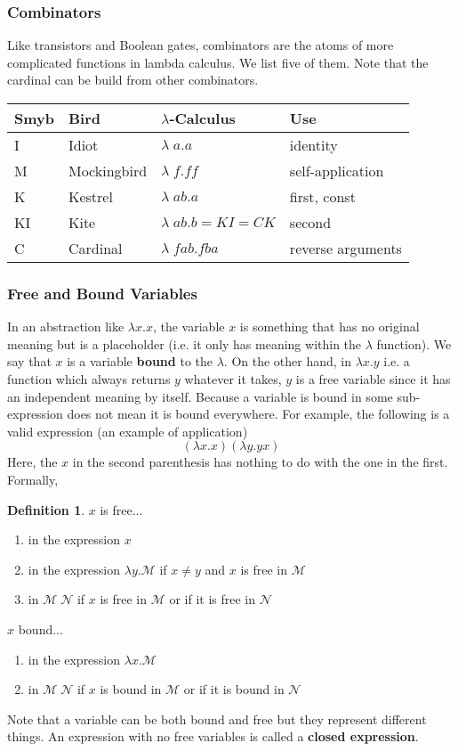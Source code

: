 \documentclass[a4paper, 12pt]{report}
\theoremstyle{remark}
\theoremstyle{definition}
\newtheorem{definition}{Definition}[section]
\begin{document}
\subsubsection{Combinators}
Like transistors and Boolean gates, combinators are the atoms of more complicated functions in lambda calculus. We list five of them. Note that the cardinal can be build from other combinators. 
\begin{center}
    \begin{tabular}{l|l|l|l}
    Smyb & Bird & $\lambda$-Calculus & Use \\
    \hline
    I & Idiot & $\lambda\;a.a$ & identity \\
    M & Mockingbird & $\lambda\;f.ff$ & self-application \\
    K & Kestrel & $\lambda\;ab.a $ & first, const \\
    KI & Kite & $\lambda\;ab.b = KI = CK$ & second \\
    C & Cardinal & $\lambda\;fab.fba$ & reverse arguments
\end{tabular}
\end{center}


\subsubsection{Free and Bound Variables}
In an abstraction like $\lambda x . x$, the variable $x$ is something that has no original meaning but is a placeholder (i.e. it only has meaning within the $\lambda$ function). We say that $x$ is a variable \textbf{bound} to the $\lambda$. On the other hand, in $\lambda x . y$ i.e. a function which always returns $y$ whatever it takes, $y$ is a free variable since it has an independent meaning by itself. Because a variable is bound in some sub-expression does not mean it is bound everywhere. For example, the following is a valid expression (an example of application)
\[(\lambda x . x) ( \lambda y. y x)\]
Here, the $x$ in the second parenthesis has nothing to do with the one in the first. Formally, 

\begin{definition}
$x$ is free...
\begin{enumerate}
    \item in the expression $x$
    \item in the expression $\lambda y. \mathcal{M}$ if $x \neq y $ and $x$ is free in $\mathcal{M}$ 
    \item in $\mathcal{M}\; \mathcal{N}$ if $x$ is free in $\mathcal{M}$ or if it is free in $\mathcal{N}$ 
\end{enumerate}
$x$ bound...
\begin{enumerate}
    \item in the expression $\lambda x. \mathcal{M}$
    \item in $\mathcal{M} \; \mathcal{N}$ if $x$ is bound in $\mathcal{M}$ or if it is bound in $\mathcal{N}$
\end{enumerate}
\end{definition}
Note that a variable can be both bound and free but they represent different things. An expression with no free variables is called a \textbf{closed expression}. 
\end{document}

